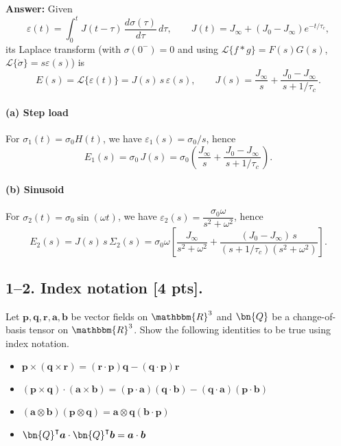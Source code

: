 \bigskip
\textbf{Answer:}
Given
\begin{equation}
  \varepsilon(t)=\int_0^t J(t-\tau)\,\frac{d\sigma(\tau)}{d\tau}\,d\tau,
  \qquad
  J(t)=J_\infty+(J_0-J_\infty)e^{-t/\tau_c},
\end{equation}
its Laplace transform (with $\sigma(0^-)=0$ and using $\mathcal{L}\{f*g\}=F(s)G(s)$,
$\mathcal{L}\{\dot{\sigma}\}=s\varepsilon(s)$) is
\begin{equation}
  E(s)=\mathcal{L}\{\varepsilon(t)\}=J(s)\,s\,\varepsilon(s),
  \qquad
  J(s)=\frac{J_\infty}{s}+\frac{J_0-J_\infty}{\,s+1/\tau_c\,}.
\end{equation}

\paragraph{(a) Step load}
For $\sigma_1(t)=\sigma_0 H(t)$, we have $\varepsilon_1(s)=\sigma_0/s$, hence
\begin{equation}
  \,E_1(s)=\sigma_0\,J(s)=\sigma_0\!\left(\frac{J_\infty}{s}+\frac{J_0-J_\infty}{\,s+1/\tau_c\,}\right).\,
\end{equation}

\paragraph{(b) Sinusoid}
For $\sigma_2(t)=\sigma_0\sin(\omega t)$, we have $\varepsilon_2(s)=\dfrac{\sigma_0\omega}{s^2+\omega^2}$, hence
\begin{equation}
  \,E_2(s)=J(s)\,s\,\Sigma_2(s)
  =\sigma_0\omega\left[\frac{J_\infty}{s^2+\omega^2}
  +\frac{(J_0-J_\infty)\,s}{(s+1/\tau_c)(s^2+\omega^2)}\right].\,
\end{equation}

\bigskip
\subsection*{1--2. \textbf{Index notation} [4 pts].} Let $\bm{p}, \bm{q}, \bm{r}, \bm{a}, \bm{b}$ be vector fields on $\mathbbm{R}^3$ and $\bn{Q}$ be a change-of-basis tensor on $\mathbbm{R}^3$. Show the following identities to be true using index notation. 

\begin{itemize}
    \item $\bm{p} \times (\bm{q} \times \bm{r}) = (\bm{r} \cdot \bm{p}) \bm{q} - (\bm{q} \cdot \bm{p}) \bm{r}$
    \item $(\bm{p} \times \bm{q}) \cdot (\bm{a} \times \bm{b}) = (\bm{p} \cdot \bm{a}) (\bm{q} \cdot \bm{b}) - (\bm{q} \cdot \bm{a})(\bm{p} \cdot \bm{b})$
    \item $(\bm{a} \otimes \bm{b})(\bm{p} \otimes \bm{q}) = \bm{a}\otimes\bm{q}(\bm{b} \cdot \bm{p}) $
    \item $\bn{Q}^\intercal\bm{a} \cdot \bn{Q}^\intercal\bm{b} = \bm{a}\cdot\bm{b} $
\end{itemize}

